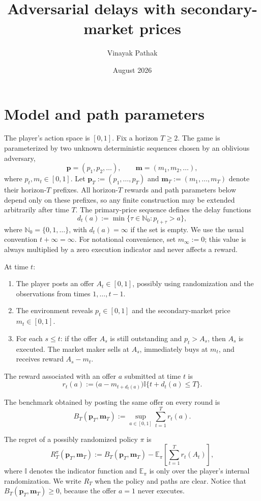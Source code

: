\documentclass[11pt]{article}
\title{Adversarial delays with secondary-market prices}
\author{Vinayak Pathak}
\date{August 2026}
\theoremstyle{definition}
\begin{document}
\maketitle

\section{Model and path parameters}
\label{sec:model-and-path-parameters}

The player's action space is $[0,1]$. Fix a horizon $T\ge 2$. The
game is parameterized by two unknown deterministic sequences chosen by
an oblivious adversary,
\[
    \boldsymbol{p}=(p_1,p_2,\ldots),
    \qquad
    \boldsymbol{m}=(m_1,m_2,\ldots),
\]
where $p_t,m_t\in[0,1]$. Let
$\boldsymbol{p}_T:=(p_1,\ldots,p_T)$ and
$\boldsymbol{m}_T:=(m_1,\ldots,m_T)$ denote their horizon-$T$ prefixes.
All horizon-$T$ rewards and path parameters below depend only on these
prefixes, so any finite construction may be extended arbitrarily after
time $T$.
The primary-price sequence defines the delay functions
\[
    d_t(a):=\min\bigl\{\tau\in\mathbb{N}_0:p_{t+\tau}>a\bigr\},
\]
where $\mathbb{N}_0=\{0,1,\ldots\}$, with $d_t(a)=\infty$ if the set is
empty. We use the usual convention $t+\infty=\infty$. For notational
convenience, set $m_\infty:=0$; this value is always multiplied by a zero
execution indicator and never affects a reward.

At time $t$:
\begin{enumerate}
    \item The player posts an offer $A_t\in[0,1]$, possibly using
    randomization and the observations from times $1,\ldots,t-1$.
    \item The environment reveals $p_t\in[0,1]$ and the secondary-market
    price $m_t\in[0,1]$.
    \item For each $s\le t$: if the offer $A_s$ is still outstanding and
    $p_t>A_s$, then $A_s$ is executed. The market maker sells at $A_s$,
    immediately buys at $m_t$, and receives reward $A_s-m_t$.
\end{enumerate}

The reward associated with an offer $a$ submitted at time $t$ is
\[
    r_t(a):=
    \bigl(a-m_{t+d_t(a)}\bigr)
    \mathbb{I}\bigl\{t+d_t(a)\le T\bigr\}.
\]

The benchmark obtained by posting the same offer on every round is
\[
    B_T(\boldsymbol{p}_T,\boldsymbol{m}_T)
    :=
    \sup_{a\in[0,1]}\sum_{t=1}^T r_t(a).
\]

The regret of a possibly randomized policy $\pi$ is
\[
    R_T^\pi(\boldsymbol{p}_T,\boldsymbol{m}_T)
    :=
    B_T(\boldsymbol{p}_T,\boldsymbol{m}_T)
    -
    \mathbb{E}_\pi\left[\sum_{t=1}^T r_t(A_t)\right],
\]
where $\mathbb{I}$ denotes the indicator function and
$\mathbb{E}_\pi$ is only over the player's internal randomization. We
write $R_T$ when the policy and paths are clear. Notice that
$B_T(\boldsymbol{p}_T,\boldsymbol{m}_T)\ge0$, because the offer $a=1$
never executes.
\end{document}
